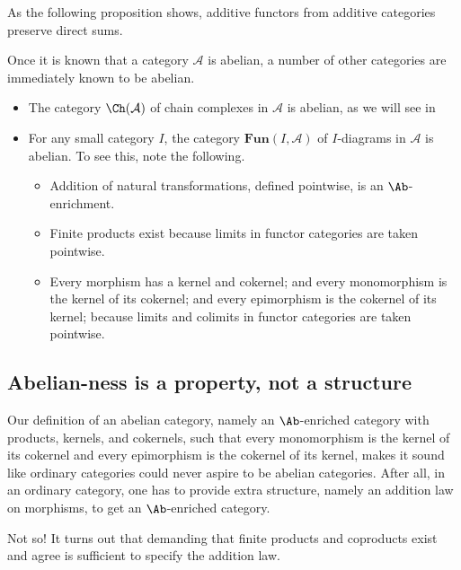 \documentclass[main.tex]{subfiles}
\begin{document}
As the following proposition shows, additive functors from additive categories preserve direct sums.
\begin{example}
  \label{eg:examples_of_abelian_categories}
  Once it is known that a category $\mathcal{A}$ is abelian, a number of other categories are immediately known to be abelian.
  \begin{itemize}
    \item The category $\Ch(\mathcal{A})$ of chain complexes in $\mathcal{A}$ is abelian, as we will see in

    \item For any small category $I$, the category $\mathbf{Fun}(I, \mathcal{A})$ of $I$-diagrams in $\mathcal{A}$ is abelian. To see this, note the following.
      \begin{itemize}
        \item Addition of natural transformations, defined pointwise, is an $\Ab$-enrichment.

        \item Finite products exist because limits in functor categories are taken pointwise.

        \item Every morphism has a kernel and cokernel; and every monomorphism is the kernel of its cokernel; and every epimorphism is the cokernel of its kernel; because limits and colimits in functor categories are taken pointwise.
      \end{itemize}
  \end{itemize}
\end{example}

\subsection{Abelian-ness is a property, not a structure}
\label{ssc:abelian_ness_is_a_property_not_a_structure}

Our definition of an abelian category, namely an $\Ab$-enriched category with products, kernels, and cokernels, such that every monomorphism is the kernel of its cokernel and every epimorphism is the cokernel of its kernel, makes it sound like ordinary categories could never aspire to be abelian categories. After all, in an ordinary category, one has to provide extra structure, namely an addition law on morphisms, to get an $\Ab$-enriched category.

Not so! It turns out that demanding that finite products and coproducts exist and agree is sufficient to specify the addition law.
\end{document}
